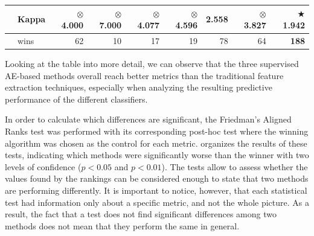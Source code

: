 \begin{table}[ht]
{{\begin{tabular}{llrrrrrrr}
                                             & Kappa                       & \(\otimes\) 4.000          & \(\otimes\) 7.000  & \(\otimes\) 4.077  & \(\otimes\) 4.596 & 2.558                                   & \(\otimes\) 3.827  & \(\bigstar\) {\bfseries1.942} \tabularnewline
      \midrule
                                             & wins                        & 62                         & 10                 & 17                 & 19                & 78                                      & 64                 & {\bfseries 188} \tabularnewline              %
      \bottomrule %
    \end{tabular}}}
\end{table}

Looking at the table into more detail, we can observe that the three supervised AE-based methods overall reach better metrics than the traditional feature extraction techniques, especially when analyzing the resulting predictive performance of the different classifiers.

In order to calculate which differences are significant, the Friedman's Aligned Ranks test %
was performed with its corresponding post-hoc test where the winning algorithm was chosen as the control for each metric.  organizes the results of these tests, indicating which methods  were significantly worse than the winner with two levels of confidence ($p<0.05$ and $p<0.01$). The tests allow to assess whether the values found by the rankings can be considered enough to state that two methods are performing differently. It is important to notice, however, that each statistical test had information only about a specific metric, and not the whole picture. As a result, the fact that a test does not find significant differences among two methods does not mean that they perform the same in general.

